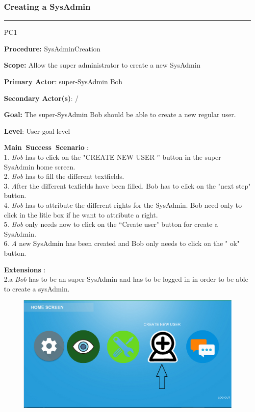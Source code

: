 \subsubsection{Creating a SysAdmin}

\hrule
\vspace{0.5cm}
\begin{lyxlist}{PC1}
\small{
\item [\textbf{Procedure:}] SysAdminCreation 
\item [\textbf{Scope:}] Allow the super administrator to create a new SysAdmin
\item [\textbf{Primary Actor}:] super-SysAdmin Bob
\item [\textbf{Secondary Actor(s)}:] /
\item [\textbf{Goal:}] The super-SysAdmin Bob should be able to create a new
regular user.
\item [\textbf{Level}:] User-goal level
\item [\textbf{Main~Success~Scenario}]:\\
1. \emph{Bob} has to click on the "CREATE NEW USER '' button in the super-SysAdmin home
screen.\\
2. \emph{Bob} has to fill the different textfields.\\
3. \emph After the different texfields have been filled. {Bob} has to click on
the "next step" button.\\
4. \emph{Bob} has to attribute the different rights for the SysAdmin.
{Bob} need only to click in the litle box if he want to attribute a right.\\
5. \emph{Bob} only needs now to click on the ``Create user" button for create a
SysAdmin.
\\
6. \emph A new SysAdmin has been created and {Bob} only needs to click
on the " ok" button.\\

\item [\textbf{Extensions}]:\\
2.a \emph{Bob} has to be an super-SysAdmin and has to be logged in in order to
be able to create a sysAdmin.\\
}

\begin{figure}[H]
\centering
\includegraphics[width=170mm]{images/CreateSys1.eps}
\caption{\label{overflow}}
\end{figure}


\end{lyxlist}
